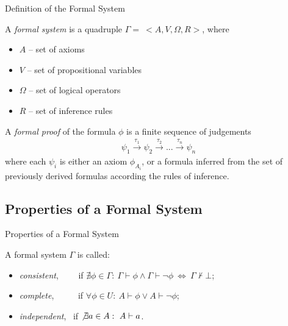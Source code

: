\documentclass[aspectratio=169, fleqn]{beamer}
\begin{document}
\begin{frame}{Definition of the Formal System}%

A \textit{formal system} is a quadruple $\Gamma = \ <A, V, \Omega, R>$, where
\begin{itemize}
  \item $A$ -- set of axioms
  \item $V$ -- set of propositional variables
  \item $\Omega$ -- set of logical operators
  \item $R$ -- set of inference rules
\end{itemize} 

\vspace{15pt}

A \textit{formal proof} of the formula $\phi$ is a finite sequence of judgements 
\begin{align*}
\psi_1 \xrightarrow{\tau_1} \psi_2 \xrightarrow{\tau_2} ... \xrightarrow{\tau_n} \psi_n 
\end{align*}
where each $\psi_i$ is either an axiom $\phi_{A_i}$, or a formula inferred from the set of previously derived formulas according the rules of inference.

\end{frame}

\subsection{Properties of a Formal System}
\begin{frame}
{Properties of a Formal System}

A formal system $\Gamma$ is called:

\begin{itemize}
\item  \textit{consistent}, \ \ \ \ if $\nexists \phi \in \Gamma: \ \Gamma \vdash \phi \land  \Gamma \vdash \neg \phi  \ \Leftrightarrow \ \Gamma \nvdash \bot$; 
\\ \vspace{3pt}
\item \textit{complete}, \ \ \ \ \ if $\forall \phi \in U: \ A \vdash \phi \lor A \vdash \neg \phi$;
\\ \vspace{3pt}
\item \textit{independent}, \ if $\not \exists a \in A: \ A \vdash a$.
\end{itemize}


\end{frame}
\end{document}
